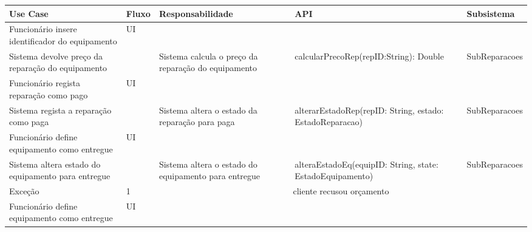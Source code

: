 \documentclass[../relatorio.tex]{subfiles}
\begin{document}
\begin{landscape}
    \begin{table}[!h]
        \centering
        \begin{tabular}{|p{5cm}|p{1cm}|p{4cm}|p{6cm}|p{3cm}|}
            \hline
            \rowcolor{gray!20!white}
            Use Case & Fluxo & Responsabilidade & API & Subsistema \\
            \hline
            \rowcolor{yellow}
            Funcionário insere identificador do equipamento
                     & UI
                     &
                     &
                     &
            \\
            \hline
            Sistema devolve preço da reparação do equipamento
                     &
                     & Sistema calcula o preço da reparação do equipamento
                     & calcularPrecoRep(repID:String): Double
                     & SubReparacoes
            \\
            \hline
            \rowcolor{yellow}
            Funcionário regista reparação como pago
                     & UI
                     &
                     &
                     &
            \\
            \hline
            Sistema regista a reparação como paga
                     & 
                     & Sistema altera o estado da reparação para paga 
                     & alterarEstadoRep(repID: String, estado: EstadoReparacao)
                     & SubReparacoes
            \\
            \hline
            \rowcolor{yellow}
            Funcionário define equipamento como entregue
                     & UI
                     &
                     &
                     &
            \\
            \hline
            Sistema altera estado do equipamento para entregue
                     &
                     & Sistema altera o estado do equipamento para entregue
                     & alteraEstadoEq(equipID: String, state: EstadoEquipamento)
                     & SubReparacoes
            \\
            \hline
            \rowcolor{red!30}
            Exceção  
                    &
            1           
                    &
            \multicolumn{3}{c}{cliente recusou orçamento}
            \\
            \hline
            \rowcolor{yellow}
            Funcionário define equipamento como entregue
                    & UI
                    &

\end{tabular}
\end{table}
\end{landscape}
\end{document}
